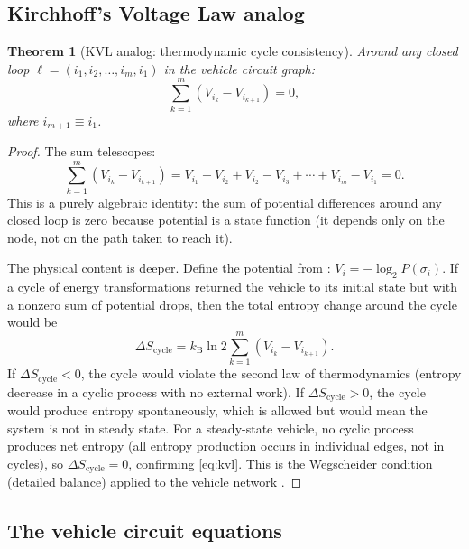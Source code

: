 \documentclass[twocolumn,10pt,a4paper]{article}
\newtheorem{theorem}{Theorem}[section]
\theoremstyle{definition}
\theoremstyle{remark}
\newcommand{\kB}{k_{\mathrm{B}}}
\begin{document}
\subsection{Kirchhoff's Voltage Law analog}

\begin{theorem}[KVL analog: thermodynamic cycle consistency]\label{thm:kvl}
Around any closed loop $\ell = (i_1, i_2, \ldots, i_m, i_1)$ in the vehicle circuit graph:
\begin{equation}\label{eq:kvl}
\sum_{k=1}^{m} (V_{i_k} - V_{i_{k+1}}) = 0,
\end{equation}
where $i_{m+1} \equiv i_1$.
\end{theorem}

\begin{proof}
The sum telescopes:
\begin{equation}
\sum_{k=1}^{m} (V_{i_k} - V_{i_{k+1}}) = V_{i_1} - V_{i_2} + V_{i_2} - V_{i_3} + \cdots + V_{i_m} - V_{i_1} = 0.
\end{equation}
This is a purely algebraic identity: the sum of potential differences around any closed loop is zero because potential is a state function (it depends only on the node, not on the path taken to reach it).

The physical content is deeper. Define the potential from : $V_i = -\log_2 P(\sigma_i)$. If a cycle of energy transformations returned the vehicle to its initial state but with a nonzero sum of potential drops, then the total entropy change around the cycle would be
\begin{equation}
\Delta S_{\mathrm{cycle}} = \kB \ln 2 \sum_{k=1}^{m} (V_{i_k} - V_{i_{k+1}}).
\end{equation}
If $\Delta S_{\mathrm{cycle}} < 0$, the cycle would violate the second law of thermodynamics (entropy decrease in a cyclic process with no external work). If $\Delta S_{\mathrm{cycle}} > 0$, the cycle would produce entropy spontaneously, which is allowed but would mean the system is not in steady state. For a steady-state vehicle, no cyclic process produces net entropy (all entropy production occurs in individual edges, not in cycles), so $\Delta S_{\mathrm{cycle}} = 0$, confirming \eqref{eq:kvl}. This is the Wegscheider condition (detailed balance) applied to the vehicle network \citep{Wegscheider1901, BeardQian2008}.
\end{proof}

\subsection{The vehicle circuit equations}
\end{document}

